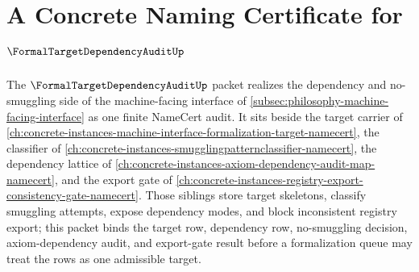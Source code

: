 \chapter{A Concrete Naming Certificate for $\FormalTargetDependencyAuditUp$}
\label{ch:concrete-instances-formal-target-dependency-audit-namecert}

The $\FormalTargetDependencyAuditUp$ packet realizes the dependency and no-smuggling side of the machine-facing interface of \autoref{subsec:philosophy-machine-facing-interface} as one finite NameCert audit. It sits beside the target carrier of \autoref{ch:concrete-instances-machine-interface-formalization-target-namecert}, the classifier of \autoref{ch:concrete-instances-smugglingpatternclassifier-namecert}, the dependency lattice of \autoref{ch:concrete-instances-axiom-dependency-audit-map-namecert}, and the export gate of \autoref{ch:concrete-instances-registry-export-consistency-gate-namecert}. Those siblings store target skeletons, classify smuggling attempts, expose dependency modes, and block inconsistent registry export; this packet binds the target row, dependency row, no-smuggling decision, axiom-dependency audit, and export-gate result before a formalization queue may treat the rows as one admissible target.

